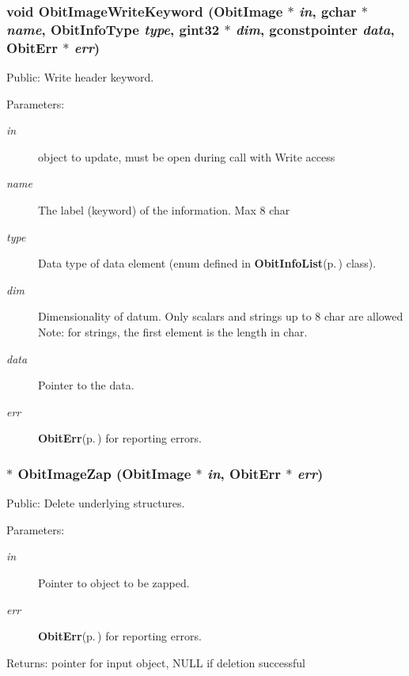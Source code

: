 \subsubsection{\setlength{\rightskip}{0pt plus 5cm}void Obit\-Image\-Write\-Keyword ({\bf Obit\-Image} $\ast$ {\em in}, gchar $\ast$ {\em name}, Obit\-Info\-Type {\em type}, gint32 $\ast$ {\em dim}, gconstpointer {\em data}, {\bf Obit\-Err} $\ast$ {\em err})}\label{ObitImage_8h_a40}


Public: Write header keyword. 

\begin{Desc}
\item[Parameters:]
\begin{description}
\item[{\em in}]object to update, must be open during call with Write access \item[{\em name}]The label (keyword) of the information. Max 8 char \item[{\em type}]Data type of data element (enum defined in {\bf Obit\-Info\-List}{\rm (p.\,\pageref{structObitInfoList})} class). \item[{\em dim}]Dimensionality of datum. Only scalars and strings up to 8 char are allowed Note: for strings, the first element is the length in char. \item[{\em data}]Pointer to the data. \item[{\em err}]{\bf Obit\-Err}{\rm (p.\,\pageref{structObitErr})} for reporting errors. \end{description}
\end{Desc}
\subsubsection{$\ast$ Obit\-Image\-Zap ({\bf Obit\-Image} $\ast$ {\em in}, {\bf Obit\-Err} $\ast$ {\em err})}\label{ObitImage_8h_a23}


Public: Delete underlying structures. 

\begin{Desc}
\item[Parameters:]
\begin{description}
\item[{\em in}]Pointer to object to be zapped. \item[{\em err}]{\bf Obit\-Err}{\rm (p.\,\pageref{structObitErr})} for reporting errors. \end{description}
\end{Desc}
\begin{Desc}
\item[Returns:]pointer for input object, NULL if deletion successful \end{Desc}

